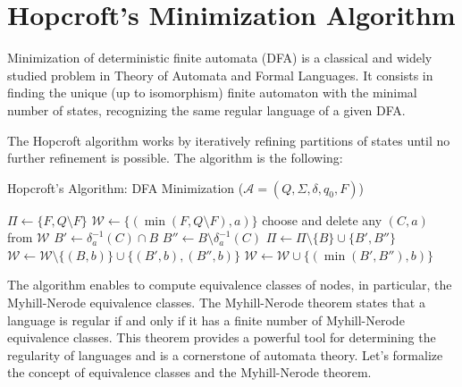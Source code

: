 \section{Hopcroft's Minimization Algorithm}
Minimization of deterministic finite automata (DFA) is a classical and widely studied problem in Theory of Automata and Formal Languages. It consists in finding the unique (up to isomorphism) finite automaton with the minimal number of states, recognizing the same regular language of a given DFA.

The Hopcroft algorithm works by iteratively refining partitions of states until no further refinement is possible. The algorithm is the following:

\begin{algorithm}
    \caption{Hopcroft's Algorithm: DFA Minimization ($\mathcal{A} = (Q, \Sigma, \delta, q_0, F)$)}
    \begin{algorithmic}[1]
        \State $\Pi \gets \{F, Q \setminus F\}$
            \State $\mathcal{W} \gets \{(\min(F, Q \setminus F), a)\}$
        \EndFor
            \State choose and delete any $(C, a)$ from $\mathcal{W}$
                    \State $B' \gets \delta_a^{-1}(C) \cap B$
                    \State $B'' \gets B \setminus \delta_a^{-1}(C)$
                    \State $\Pi \gets \Pi \setminus \{B\} \cup \{B', B''\}$
                            \State $\mathcal{W} \gets \mathcal{W} \setminus \{(B, b)\} \cup \{(B', b), (B'', b)\}$
                        \Else
                            \State $\mathcal{W} \gets \mathcal{W} \cup \{(\min(B', B''), b)\}$
                        \EndIf
                    \EndFor
                \EndIf
            \EndFor
        \EndWhile
    \end{algorithmic}
\end{algorithm}

The algorithm enables to compute equivalence classes of nodes, in particular, the Myhill-Nerode equivalence classes. The Myhill-Nerode theorem states that a language is regular if and only if it has a finite number of Myhill-Nerode equivalence classes. This theorem provides a powerful tool for determining the regularity of languages and is a cornerstone of automata theory. Let's formalize the concept of equivalence classes and the Myhill-Nerode theorem.

